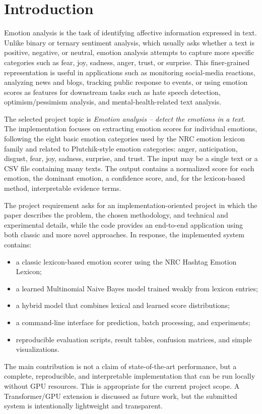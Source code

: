 \section{Introduction}

Emotion analysis is the task of identifying affective information expressed in text. Unlike binary or ternary sentiment analysis, which usually asks whether a text is positive, negative, or neutral, emotion analysis attempts to capture more specific categories such as fear, joy, sadness, anger, trust, or surprise. This finer-grained representation is useful in applications such as monitoring social-media reactions, analyzing news and blogs, tracking public response to events, or using emotion scores as features for downstream tasks such as hate speech detection, optimism/pessimism analysis, and mental-health-related text analysis.

The selected project topic is \textit{Emotion analysis -- detect the emotions in a text}. The implementation focuses on extracting emotion scores for individual emotions, following the eight basic emotion categories used by the NRC emotion lexicon family and related to Plutchik-style emotion categories: anger, anticipation, disgust, fear, joy, sadness, surprise, and trust. The input may be a single text or a CSV file containing many texts. The output contains a normalized score for each emotion, the dominant emotion, a confidence score, and, for the lexicon-based method, interpretable evidence terms.

The project requirement asks for an implementation-oriented project in which the paper describes the problem, the chosen methodology, and technical and experimental details, while the code provides an end-to-end application using both classic and more novel approaches. In response, the implemented system contains:

\begin{itemize}
    \item a classic lexicon-based emotion scorer using the NRC Hashtag Emotion Lexicon;
    \item a learned Multinomial Naive Bayes model trained weakly from lexicon entries;
    \item a hybrid model that combines lexical and learned score distributions;
    \item a command-line interface for prediction, batch processing, and experiments;
    \item reproducible evaluation scripts, result tables, confusion matrices, and simple visualizations.
\end{itemize}

The main contribution is not a claim of state-of-the-art performance, but a complete, reproducible, and interpretable implementation that can be run locally without GPU resources. This is appropriate for the current project scope. A Transformer/GPU extension is discussed as future work, but the submitted system is intentionally lightweight and transparent.
